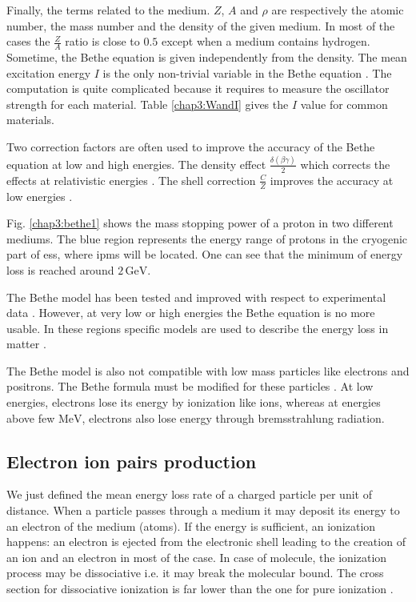 \begin{refsection}
	Finally, the terms related to the medium. \(Z\), \(A\) and \(\rho\) are respectively the atomic number, the mass number and the density of the given medium. In most of the cases the \(\frac{Z}{A}\) ratio is close to \(0.5\) except when a medium contains hydrogen. Sometime, the Bethe equation is given independently from the density.
	The mean excitation energy \(I\) is the only non-trivial variable in the Bethe equation \cite{Berger1984,Berger1993}. The computation is quite complicated because it requires to measure the oscillator strength for each material. Table \ref{chap3:WandI} gives the \(I\) value for common materials.

	Two correction factors are often used to improve the accuracy of the Bethe equation at low and high energies. The density effect \(\frac{\delta(\beta \gamma)}{2}\) which corrects the effects at relativistic energies \cite{Sternheimer1984}. The shell correction \(\frac{C}{Z}\) improves the accuracy at low energies \cite{Bichsel2002}.

	

	Fig. \ref{chap3:bethe1} shows the mass stopping power of a proton in two different mediums. The blue region represents the energy range of protons in the cryogenic part of \acrshort{ess}, where \acrshort{ipm}s will be located. One can see that the minimum of energy loss is reached around \(2\,\mathrm{GeV}\).

	The Bethe model has been tested and improved with respect to experimental data \cite{Porter1990}. However, at very low or high energies the Bethe equation is no more usable. In these regions specific models are used to describe the energy loss in matter \cite{Ziegler1985, Allison1980}.

	The Bethe model is also not compatible with low mass particles like electrons and positrons. The Bethe formula must be modified for these particles \cite{Rieke1972}\cite[p. 452]{Tanabashi2018}. At low energies, electrons lose its energy by ionization like ions, whereas at energies above few \(\mathrm{MeV}\), electrons also lose energy through bremsstrahlung radiation.

	\subsection{Electron ion pairs production}
	We just defined the mean energy loss rate of a charged particle per unit of distance. When a particle passes through a medium it may deposit its energy to an electron of the medium (atoms).
	If the energy is sufficient, an ionization happens: an electron is ejected from the electronic shell leading to the creation of an ion and an electron in most of the case. In case of molecule, the ionization process may be dissociative i.e. it may break the molecular bound. The cross section for dissociative ionization is far lower than the one for pure ionization \cite{Dimopoulou2004}.


\end{refsection}
